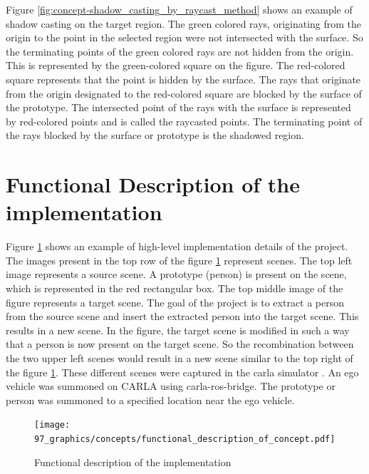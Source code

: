Figure \ref{fig:concept-shadow_casting_by_raycast_method} shows an example of shadow casting on the target region. The green colored rays, originating from the origin to the point in the selected region were not intersected with the surface. So the terminating points of the green colored rays are not hidden from the origin. This is represented by the green-colored square on the figure. The red-colored square represents that the point is hidden by the surface. The rays that originate from the origin designated to the red-colored square are blocked by the surface of the prototype. The intersected point of the rays with the surface is represented by red-colored points and is called the raycasted points. The terminating point of the rays blocked by the surface or prototype is the shadowed region.

\section{Functional Description of the implementation}

Figure \ref{fig:functional_description_of_concept} shows an example of high-level implementation details of the project. The images present in the top row of the figure \ref{fig:functional_description_of_concept} represent scenes. The top left image represents a source scene. A prototype (person) is present on the scene, which is represented in the red rectangular box. The top middle image of the figure represents a target scene. The goal of the project is to extract a person from the source scene and insert the extracted person into the target scene. This results in a new scene. In the figure, the target scene is modified in such a way that a person is now present on the target scene. So the recombination between the two upper left scenes would result in a new scene similar to the top right of the figure \ref{fig:functional_description_of_concept}.
These different scenes were captured in the \acrfull{carla} simulator \parencite{Dosovitskiy17}. An ego vehicle was summoned on CARLA using carla-ros-bridge. The prototype or person was summoned to a specified location near the ego vehicle.

\begin{figure}[htbp]
    \centering
    \texttt{[image: 97\_graphics/concepts/functional\_description\_of\_concept.pdf]}
    \caption{Functional description of the implementation}
    \label{fig:functional_description_of_concept}
\end{figure}

